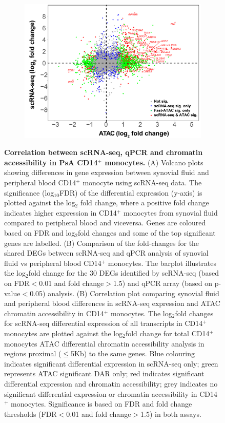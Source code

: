 \begin{figure}[htbp]
\begin{subfigure}[b]{0.50\textwidth}
\includegraphics[width=\textwidth]{./Appendix/pdfs/Chapter5/PSA_monocytes_scanpy_single_cell_SFvsPB_scRNA_ATAC_corelation}
\caption{}
\end{subfigure}
\caption[Differential gene expression between synovial fluid and peripheral blood PsA CD14$^+$ monocytes and correlation with qPCR and chromatin accessibility]{\textbf{Correlation between scRNA-seq, qPCR and chromatin accessibility in PsA CD14$^+$ monocytes.} (A) Volcano plots showing differences in gene expression between synovial fluid and peripheral blood CD14$^+$ monocyte using scRNA-seq data. The significance (log$_{10}$FDR) of the differential expression (y-axis) is plotted against the log${_2}$ fold change, where a positive fold change indicates higher expression in CD14$^+$ monocytes from synovial fluid compared to peripheral blood and viceversa. Genes are coloured based on FDR and log$_{2}$fold changes and some of the top significant genes are labelled. (B) Comparison of the fold-changes for the shared DEGs between scRNA-seq and qPCR analysis of synovial fluid vs peripheral blood CD14$^+$ monocytes. The barplot illustrates the log$_2$fold change for the 30 DEGs identified by scRNA-seq (based on FDR$<$0.01 and fold change$>$1.5) and qPCR array (based on p-value$<$0.05) analysis. (B) Correlation plot comparing synovial fluid and peripheral blood differences in scRNA-seq expression and ATAC chromatin accessibility in CD14$^+$ monocytes. The log$_2$fold changes for scRNA-seq differential expression of all transcripts in CD14$^+$ monocytes are plotted against the log$_2$fold change for total CD14$^+$ monocytes ATAC differential chromatin accessibility analysis in regions proximal ($\leq$5Kb) to the same genes. Blue colouring indicates significant differential expression in scRNA-seq only; green represents ATAC significant DAR only; red indicates significant differential expression and chromatin accessibility; grey indicates no significant differential expression or chromatin accessibility in CD14$^+$ monocytes. Significance is based on FDR and fold change thresholds (FDR$<$0.01 and fold change$>$1.5) in both assays.}
\label{figure:PSA_monocytes_scanpy_single_cell_volcano_and_qPCR_ATAC_correlation}
\end{figure}

